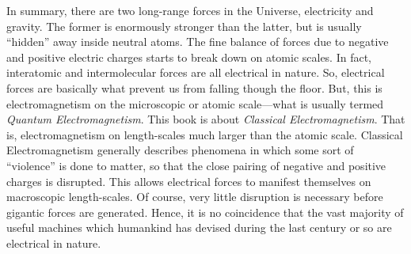In summary,
 there are two long-range forces in the Universe, electricity and gravity.
The former is enormously stronger than the latter, but is usually ``hidden'' away
inside neutral atoms. The fine balance of forces due
to negative and positive electric charges starts to break down on atomic scales.
In fact, interatomic and intermolecular forces are all
  electrical in nature. So, electrical forces
 are basically what prevent us  from
falling though the floor. But, this is electromagnetism on the 
microscopic or atomic scale---what is usually termed  {\em Quantum Electromagnetism}. This book is about
{\em Classical Electromagnetism}. That is, electromagnetism on length-scales much
larger than the atomic scale. Classical Electromagnetism 
generally describes phenomena
in which some sort of ``violence''  is done to matter, so that the
close pairing of negative and positive
charges is  disrupted. This allows electrical forces to manifest
themselves
 on macroscopic length-scales. Of course, very little disruption is necessary
before gigantic forces are generated. Hence, it is no coincidence that the vast majority
of useful machines which humankind has devised during the last century or so
are electrical in nature. 

